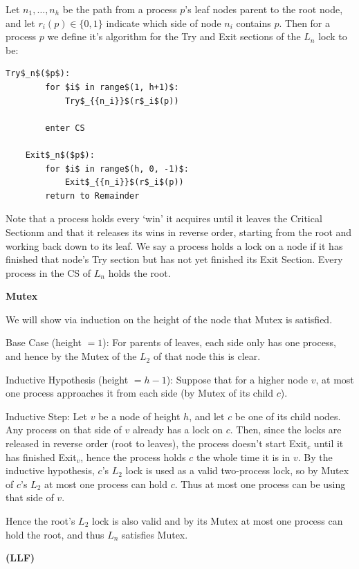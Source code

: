 \documentclass[12pt]{article}
\begin{document}
\begin{solution}
    Let $n_1, \ldots, n_h$ be the path from a process $p$'s leaf nodes parent to the root node, and let $r_i(p) \in \{0, 1\}$ indicate which side of node $n_i$ contains $p$. Then for a process $p$ we define it's algorithm for the Try and Exit sections of the $L_n$ lock to be: 

\begin{lstlisting}[mathescape]
    Try$_n$($p$): 
        for $i$ in range$(1, h+1)$: 
            Try$_{{n_i}}$(r$_i$(p))

        enter CS
    
    Exit$_n$($p$): 
        for $i$ in range$(h, 0, -1)$: 
            Exit$_{{n_i}}$(r$_i$(p))
        return to Remainder
\end{lstlisting}
    Note that a process holds every `win' it acquires until it leaves the Critical Sectionm and that it releases its wins in reverse order, starting from the root and working back down to its leaf. We say a process holds a lock on a node if it has finished that node's Try section but has not yet finished its Exit Section. Every process in the CS of $L_n$ holds the root.  


    \textbf{Mutex} 

    We will show via induction on the height of the node that Mutex is satisfied. 
    
    Base Case (height $= 1$): For parents of leaves, each side only has one process, and hence by the Mutex of the $L_2$ of that node this is clear.

    Inductive Hypothesis (height $= h-1$): Suppose that for a higher node $v$, at most one process approaches it from each side (by Mutex of its child $c$). 
    
    Inductive Step: Let $v$ be a node of height $h$, and let $c$ be one of its child nodes. Any process on that side of $v$ already has a lock on $c$. Then, since the locks are released in reverse order (root to leaves), the process doesn't start Exit$_c$ until it has finished Exit$_v$, hence the process holds $c$ the whole time it is in $v$. By the inductive hypothesis, $c$'s $L_2$ lock is used as a valid two-process lock, so by Mutex of $c$'s $L_2$ at most one process can hold $c$. Thus at most one process can be using that side of $v$.

    Hence the root's $L_2$ lock is also valid and by its Mutex at most one process can hold the root, and thus $L_n$ satisfies Mutex.

    \bbni
    \textbf{(LLF)} 
    

\end{solution}
\end{document}
